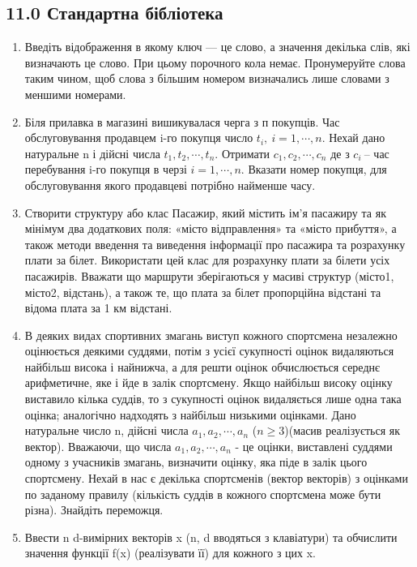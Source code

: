 \documentclass[]{article}
\begin{document}
\subsection{11.0 Стандартна бібліотека
}\label{ux441ux442ux430ux43dux434ux430ux440ux442ux43dux430-ux431ux456ux431ux43bux456ux43eux442ux435ux43aux430}

\begin{enumerate}
\def\labelenumi{\arabic{enumi})}
\item
  Введіть відображення в якому ключ --- це слово, а значення декілька
  слів, які визначають це слово. При цьому порочного кола немає.
  Пронумеруйте слова таким чином, щоб слова з більшим номером
  визначались лише словами з меншими номерами.
\item
  Біля прилавка в магазині вишикувалася черга з п покупців. Час
  обслуговування продавцем i-го покупця число
  \(t_{i},\ i = 1,\cdots,n\). Нехай дано натуральне n і дійсні числа
  \(t_{1},t_{2},\cdots,t_{n}\). Отримати \(c_{1},c_{2},\cdots,c_{n}\) де
  з \(c_{i}\ \)-- час перебування i-го покупця в черзі
  \(i = 1,\cdots,n\). Вказати номер покупця, для обслуговування якого
  продавцеві потрібно найменше часу.
\item
  Створити структуру або клас Пасажир, який містить ім'я пасажиру та як
  мінімум два додаткових поля: «місто відправлення» та «місто прибуття»,
  а також методи введення та виведення інформації про пасажира та
  розрахунку плати за білет. Використати цей клас для розрахунку плати
  за білети усіх пасажирів. Вважати що маршрути зберігаються у масиві
  структур (місто1, місто2, відстань), а також те, що плата за білет
  пропорційна відстані та відома плата за 1 км відстані.
\item
  В деяких видах спортивних змагань виступ кожного спортсмена незалежно
  оцінюється деякими суддями, потім з усієї сукупності оцінок
  видаляються найбільш висока і найнижча, а для решти оцінок
  обчислюється середнє арифметичне, яке і йде в залік спортсмену. Якщо
  найбільш високу оцінку виставило кілька суддів, то з сукупності оцінок
  видаляється лише одна така оцінка; аналогічно надходять з найбільш
  низькими оцінками. Дано натуральне число n, дійсні числа
  \(a_{1},a_{2},\cdots,a_{n}\) (\(n \geq 3\))(масив реалізується як
  вектор). Вважаючи, що числа \(a_{1},a_{2},\cdots,a_{n}\) - це оцінки,
  виставлені суддями одному з учасників змагань, визначити оцінку, яка
  піде в залік цього спортсмену. Нехай в нас є декілька спортсменів
  (вектор векторів) з оцінками по заданому правилу (кількість суддів в
  кожного спортсмена може бути різна). Знайдіть переможця.
\item
  Ввести n d-вимірних векторів x (n, d вводяться з клавіатури) та
  обчислити значення функції f(x) (реалізувати її) для кожного з цих x.
\end{enumerate}
\end{document}
